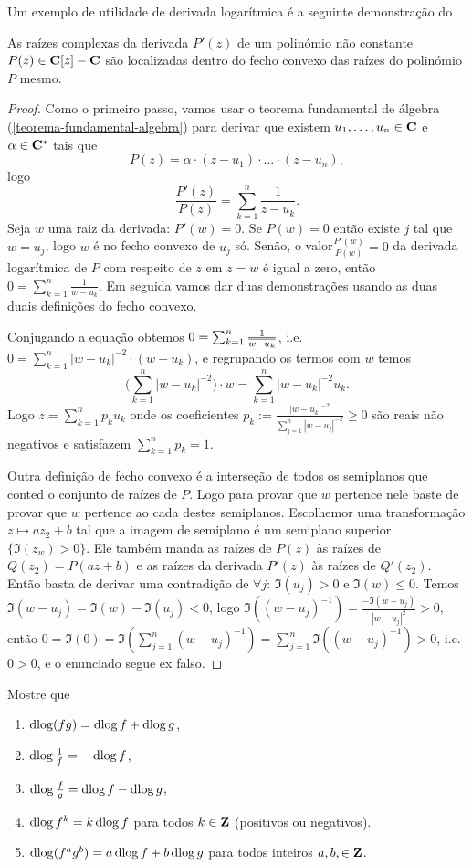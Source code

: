 Um exemplo de utilidade de derivada logarítmica é a seguinte demonstração do
\begin{teorema}
As raízes complexas da derivada $P'(z)$ de um polinómio não constante $P(z)\in\mathbf{C}[z]-\mathbf{C}$
são localizadas dentro
do fecho convexo das raízes do polinómio $P$ mesmo.
\end{teorema}
\begin{proof}
Como o primeiro passo, vamos usar o teorema fundamental de álgebra (\cref{teorema-fundamental-algebra})
para derivar que existem $u_1,\dots,u_n \in \mathbf{C}$ e $\alpha \in \mathbf{C}^*$ tais que
\[ P(z) = \alpha \cdot (z-u_1) \cdot \dots \cdot (z-u_n),\]
logo
\[ \frac{P'(z)}{P(z)} = \sum_{k=1}^n \frac{1}{z-u_k} . \]
Seja $w$ uma raiz da derivada: $P'(w)=0$. Se $P(w)=0$ então existe $j$ tal que $w=u_j$,
logo $w$ é no fecho convexo de $u_j$ só. Senão, o valor$\frac{P'(w)}{P(w)} = 0$
da derivada logarítmica de $P$ com respeito de $z$ em $z=w$ é igual a zero, então
$0 = \sum_{k=1}^n \frac{1}{w-u_k}$.
Em seguida vamos dar duas demonstrações usando as duas duais definições do fecho convexo.

Conjugando a equação obtemos $0 = \sum_{k=1}^n \frac{1}{\overline{w-u_k}}$,
i.e. $0 = \sum_{k=1}^n |w-u_k|^{-2}\cdot (w-u_k)$,
e regrupando os termos com $w$ temos
\[ \big(\sum_{k=1}^n |w-u_k|^{-2}\big) \cdot w = \sum_{k=1}^n |w-u_k|^{-2} u_k. \]
Logo $z = \sum_{k=1}^n p_k u_k$
onde os coeficientes
$p_k := \frac{|w-u_k|^{-2}}{\sum_{j=1}^n |w-u_j|^{-2}} \geq 0$
são reais não negativos e satisfazem $\sum_{k=1}^n p_k = 1$.

Outra definição de fecho convexo é a interseção de todos os semiplanos que conted o conjunto de raízes de $P$.
Logo para provar que $w$ pertence nele baste de provar que $w$ pertence ao cada destes semiplanos.
Escolhemor uma transformação $z\mapsto a z_2 + b$ tal que a imagem de semiplano é um semiplano superior
$\{\Im(z_w)>0\}$.
Ele também manda as raízes de $P(z)$ às raízes de $Q(z_2) = P(az+b)$ e as raízes da derivada
$P'(z)$ às raízes de $Q'(z_2)$. Então basta de derivar uma contradição de $\forall j:\,\Im(u_j)>0$
e $\Im(w)\leq 0$. Temos $\Im(w-u_j) = \Im(w)-\Im(u_j)<0$,
logo $\Im((w-u_j)^{-1}) = \frac{-\Im(w-u_j)}{|w-u_j|^2} > 0$,
então $0 = \Im(0) = \Im(\sum_{j=1}^n (w-u_j)^{-1}) = \sum_{j=1}^n \Im((w-u_j)^{-1}) > 0$, i.e. $0>0$,
e o enunciado segue ex falso.
\end{proof}

\begin{problema}
\label{p:dlog-homomorfismo}
Mostre que
\begin{enumerate}
\item $\operatorname{dlog} (fg) = \operatorname{dlog} f + \operatorname{dlog} g$,
\item $\operatorname{dlog} \frac{1}{f} = -\operatorname{dlog} f$,
\item $\operatorname{dlog} \frac{f}{g} = \operatorname{dlog} f - \operatorname{dlog} g$,
\item $\operatorname{dlog} f^k = k \operatorname{dlog} f$ para todos $k\in\mathbf{Z}$ (positivos ou negativos).
\item $\operatorname{dlog} (f^a g^b) = a \operatorname{dlog} f + b \operatorname{dlog} g$ para todos inteiros $a,b,\in\mathbf{Z}$.
\end{enumerate}
\end{problema}

